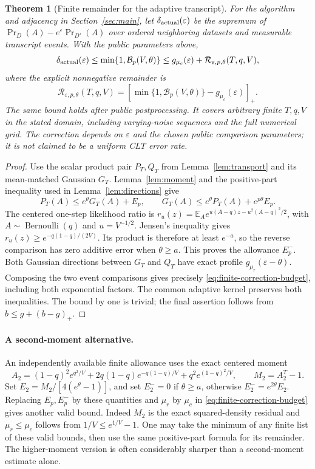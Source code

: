 \documentclass[11pt]{article}
\newtheorem{theorem}{Theorem}[section]
\newcommand{\E}{\mathbb E}
\begin{document}
\begin{theorem}[Finite remainder for the adaptive transcript]
\label{thm:finite-clt-correction}
For the algorithm and adjacency in Section~\ref{sec:main}, let
$\delta_{\rm actual}(\varepsilon)$ be the supremum of
$\Pr_D(A)-e^\varepsilon\Pr_{D'}(A)$ over ordered neighboring datasets and
measurable transcript events. With the public parameters above,
\[
 \delta_{\rm actual}(\varepsilon)\le
 \min\{1,\mathcal B_p(V,\theta)\}
 \le g_{\mu_c}(\varepsilon)+\mathcal R_{\varepsilon,p,\theta}(T,q,V),
\]
where the explicit nonnegative remainder is
\begin{equation}\label{eq:finite-clt-remainder}
 \mathcal R_{\varepsilon,p,\theta}(T,q,V)
 =\left[\min\{1,\mathcal B_p(V,\theta)\}-g_{\mu_c}(\varepsilon)\right]_+.
\end{equation}
The same bound holds after public postprocessing. It covers arbitrary finite
$T,q,V$ in the stated domain, including varying-noise sequences and the full
numerical grid. The correction depends on $\varepsilon$ and the chosen public
comparison parameters; it is not claimed to be a uniform CLT error rate.
\end{theorem}
\begin{proof}
Use the scalar product pair $P_T,Q_T$ from Lemma~\ref{lem:transport} and its
mean-matched Gaussian $G_T$. Lemma~\ref{lem:moment} and the positive-part
inequality used in Lemma~\ref{lem:directions} give
\[
 P_T(A)\le e^\theta G_T(A)+E_p,\qquad
 G_T(A)\le e^\theta P_T(A)+e^{p\theta}E_p.
\]
The centered one-step likelihood ratio is
$r_u(z)=\E_A e^{u(A-q)z-u^2(A-q)^2/2}$, with
$A\sim\operatorname{Bernoulli}(q)$ and $u=V^{-1/2}$.
Jensen's inequality gives $r_u(z)\ge e^{-q(1-q)/(2V)}$.
Its product is therefore at least $e^{-a}$, so the reverse comparison has
zero additive error when $\theta\ge a$. This proves the allowance $E_p^-$.
Both Gaussian directions between $G_T$ and $Q_T$ have exact profile
$g_{\mu_r}(\varepsilon-\theta)$.
Composing the two event comparisons gives precisely
\eqref{eq:finite-correction-budget}, including both exponential factors.
The common adaptive kernel preserves both inequalities. The bound by one
is trivial; the final assertion follows from $b\le g+(b-g)_+$.
\end{proof}

\paragraph{A second-moment alternative.}
An independently available finite allowance uses the exact centered moment
\[
 A_2=(1-q)^2e^{q^2/V}+2q(1-q)e^{-q(1-q)/V}
       +q^2e^{(1-q)^2/V},\qquad M_2=A_2^T-1.
\]
Set $E_2=M_2/[4(e^\theta-1)]$, and set $E_2^-=0$ if $\theta\ge a$,
otherwise $E_2^-=e^{2\theta}E_2$. Replacing $E_p,E_p^-$ by these quantities
and $\mu_r$ by $\mu_c$ in \eqref{eq:finite-correction-budget} gives another
valid bound. Indeed $M_2$ is the exact squared-density residual and
$\mu_r\le\mu_c$ follows from $1/V\le e^{1/V}-1$.
One may take the minimum of any finite list of these valid bounds, then
use the same positive-part formula for its remainder. The higher-moment
version is often considerably sharper than a second-moment estimate alone.
\end{document}
